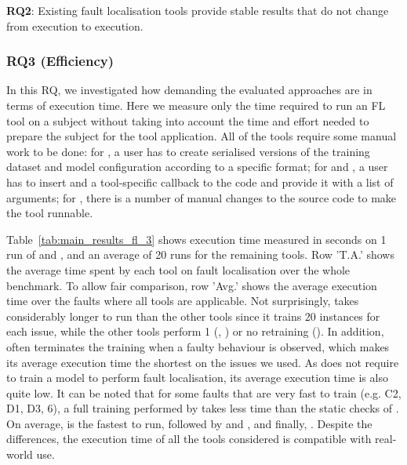 \begin{tcolorbox}[colback = box-white]
  \textbf{RQ2}: Existing fault localisation tools provide stable results that do not change from execution to execution.
\end{tcolorbox}

\subsubsection{RQ3 (Efficiency)}

In this RQ, we investigated how demanding the evaluated approaches are in terms of execution time. Here we measure only the time required to run an FL tool on a subject without taking into account the time and effort needed to prepare the subject for the tool application. All of the tools require some manual work to be done: for \dfd, a user has to create serialised versions of the training dataset and model configuration according to a specific format; for \DD and \UM, a user has to insert and a tool-specific callback to the code and provide it with a list of arguments; for \NL, there is a number of manual changes to the source code to make the tool runnable.

Table~\ref{tab:main_results_fl_3} shows execution time measured in seconds on 1 run of \dfd and \NL, and an average of 20 runs for the remaining tools. Row 'T.A.' shows the average time spent by each tool on fault localisation over the whole benchmark. To allow fair comparison, row 'Avg.' shows the average execution time over the faults where all tools are applicable. Not surprisingly, \dfd takes considerably longer to run than the other tools since it trains 20 instances for each issue, while the other tools perform 1 (\DD, \UM) or no retraining (\NL). In addition, \DD often terminates the training when a faulty behaviour is observed, which makes its average execution time the shortest on the issues we used. As \NL does not require to train a model to perform fault localisation, its average execution time is also quite low. It can be noted that for some faults that are very fast to train (e.g. C2, D1, D3, 6), a full training performed by \UM takes less time than the static checks of \NL. On average, \DD is the fastest to run, followed by \NL and \UM, and finally, \dfd. Despite the differences, the execution time of all the tools considered is compatible with real-world use.


